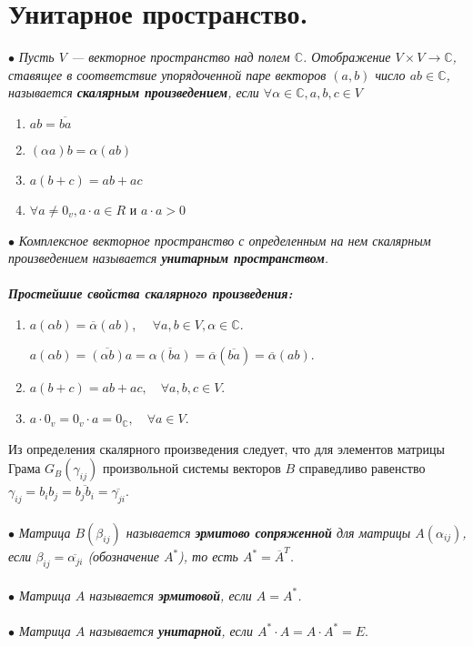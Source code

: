 \section{Унитарное пространство.}
$\bullet$ \textit{Пусть $V$ --- векторное пространство над полем $\mathbb{C}$. Отображение $V \times V\rightarrow \mathbb{C}$,
	ставящее в соответствие упорядоченной паре векторов $(a, b)$ число $ab\in \mathbb{C}$, называется \textbf{скалярным произведением}, если $\forall \alpha \in \mathbb{C}, a, b, c \in V$}\begin{enumerate}
	\item  $ab = \overline{ba}$
	\item $(\alpha a)b = \alpha(ab)$
	\item $a(b + c) = ab + ac$
	\item $\forall  a \neq 0_{v} , a\cdot a \in R$  и $a\cdot a > 0$
\end{enumerate}
$\bullet$ \textit{Комплексное векторное пространство с определенным на нем скалярным произведением называется \textbf{унитарным пространством}.}\\\\
\textit{ \textbf{Простейшие свойства скалярного произведения:}}\begin{enumerate}
	\item $a(\alpha b) = \overline{\alpha}(ab)$, $\quad\forall a, b \in V, \alpha \in \mathbb{C}$.\begin{Proof}
		$a(\alpha b) = \overline{(\alpha b)}a=\overline{\alpha(ba)}=\overline{\alpha}(\overline{ba})= \overline{\alpha}(ab)$.
	\end{Proof}
	\item $a(b+c)=ab+ac,\quad\forall a,b,c\in V$.
	\item $a\cdot 0_v=0_v \cdot a =0_{\mathbb{C}},\quad \forall a \in V$.
\end{enumerate}
Из определения скалярного произведения следует, что для элементов матрицы Грама $G_B(\gamma_{ij})$ произвольной системы векторов $B$ справедливо равенство $\gamma_{ij} = b_ib_j=\overline{b_jb_i} = \overline{\gamma_{ji}}$.\\\\
$\bullet$ \textit{Матрица $B(\beta_{ij})$ называется \textbf{эрмитово сопряженной} для матрицы $A(\alpha_{ij})$, если $\beta_{ij}=\overline{\alpha_{ji}}$ (обозначение $A^*$), то есть $A^* = \overline{A}^T$.\\\\$\bullet$ Матрица $A$ называется \textbf{эрмитовой}, если $A=A^*$.\\\\ $\bullet$ Матрица $A$ называется \textbf{унитарной}, если $A^*\cdot A = A\cdot A^* = E$}.\\\\

